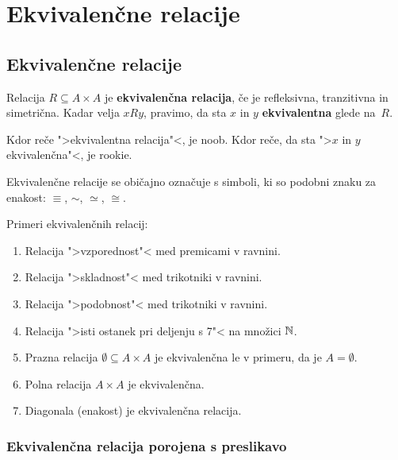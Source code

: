 \chapter{Ekvivalenčne relacije}

\section{Ekvivalenčne relacije}

\begin{definicija}
  Relacija $R \subseteq A \times A$ je \textbf{ekvivalenčna relacija}, če je refleksivna, tranzitivna in simetrična. Kadar velja $x R y$, pravimo, da sta $x$ in $y$ \textbf{ekvivalentna} glede na~$R$.
\end{definicija}

\begin{opomba}
  Kdor reče ">ekvivalentna relacija"<, je noob. Kdor reče, da sta ">$x$ in $y$
  ekvivalenčna"<, je rookie.
\end{opomba}

Ekvivalenčne relacije se običajno označuje s simboli, ki so podobni znaku za enakost:
$\equiv$, $\sim$, $\simeq$, $\cong$.

\begin{primer}
  Primeri ekvivalenčnih relacij:
  \begin{enumerate}
    \item Relacija ">vzporednost"< med premicami v ravnini.
    \item Relacija ">skladnost"< med trikotniki v ravnini.
    \item Relacija ">podobnost"< med trikotniki v ravnini.
    \item Relacija ">isti ostanek pri deljenju s 7"< na množici $\mathbb{N}$.
    \item Prazna relacija $\emptyset \subseteq A \times A$ je ekvivalenčna le v primeru, da je $A = \emptyset$.
    \item Polna relacija $A \times A$ je ekvivalenčna.
    \item Diagonala (enakost) je ekvivalenčna relacija.
  \end{enumerate}
\end{primer}

\subsection{Ekvivalenčna relacija porojena s preslikavo}


